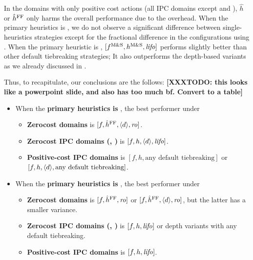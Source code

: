 In the domains with only positive cost actions (all IPC domains except  and ), $\hat{h}$ or $\hat{h}^{\text{FF}}$
only harms the overall performance due to the overhead.
When the primary heuristics is \lmcut, we do not observe a significant difference between single-heuristics strategies except for the fractional difference in the configurations using \ro.
When the primary heuristic is  \mands, $[f^\text{M\&S},h^\text{M\&S},{\text{\textit{lifo}}}]$ performs slightly better than  other default tiebreaking strategies; It also outperforms the depth-based variants as we already discussed in .

\pagebreak[3]

Thus, to recapitulate, our conclusions are the follows:
{\bf [XXXTODO: this looks like a powerpoint slide, and also has too much bf. Convert to a table]}
\begin{itemize}
 \item When the \textbf{primary heuristics is \lmcut}, the best performer under
       \begin{itemize}
        \item \textbf{Zerocost domains} is $[f,\hat{h}^{\text{FF}},{\left<d\right>},{\text{\textit{ro}}}]$.
        \item \textbf{Zerocost IPC domains (, )} is $[f,h,{\left<d\right>},{\text{\textit{lifo}}}]$.
        \item \textbf{Positive-cost IPC domains} is $[f,h, \text{any default tiebreaking}]$ or $[f,h, {\left<d\right>}, \text{any default tiebreaking}]$.
       \end{itemize}
 \item When the \textbf{primary heuristics is \mands}, the best performer under
       \begin{itemize}
        \item \textbf{Zerocost domains} is $[f,\hat{h}^{\text{FF}},{\text{\textit{ro}}}]$ or $[f,\hat{h}^{\text{FF}},{\left<d\right>},{\text{\textit{ro}}}]$, but the latter has
              a smaller variance.
        \item \textbf{Zerocost IPC domains (, )} is $[f,h,{\text{\textit{lifo}}}]$ or depth variants with any default tiebreaking.
        \item \textbf{Positive-cost IPC domains} is $[f,h,{\text{\textit{lifo}}}]$.
       \end{itemize}
\end{itemize}

